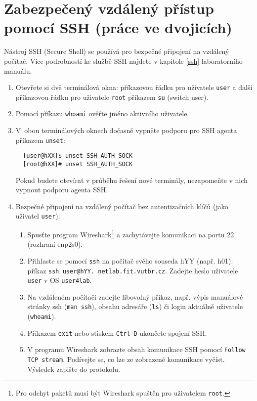 \documentclass[a4paper,11pt]{article}
\begin{document}
\section{Zabezpečený vzdálený přístup pomocí SSH (práce ve dvojicích)}
Nástroj SSH (Secure Shell) se používá pro bezpečné připojení na vzdálený počítač. Více podrobností ke službě SSH najdete v kapitole \ref{ssh} laboratorního manuálu.
\begin{enumerate}
  \item Otevřete si dvě terminálová okna: příkazovou řádku pro uživatele {\tt user} a další
    příkazovou řádku pro uživatele {\tt root} příkazem {\tt su} (switch user).
  \item Pomocí příkazu {\tt whoami} ověřte jméno aktivního uživatele. 
  \item V~obou terminálových oknech dočasně vypněte podporu pro SSH agenta příkazem {\tt unset}:
  \begin{lstlisting}
  [user@hXX]$ unset SSH_AUTH_SOCK
  [root@hXX]# unset SSH_AUTH_SOCK
  \end{lstlisting}

  Pokud budete otevírat v průběhu řešení nové terminály, nezapomeňte v nich vypnout podporu agenta SSH.

  \item Bezpečné připojení na vzdálený počítač bez autentizačních klíčů (jako uživatel {\tt user}):
    \begin{enumerate}
      \item Spusťte program Wireshark\footnote{Pro odchyt paketů musí být Wireshark spuštěn pro uživatelem {\tt root}.} a zachytávejte komunikaci na portu 22 (rozhraní enp2s0).
      \item Přihlaste se pomocí {\tt ssh} na počítač svého souseda hYY (např. h01): příkaz
        {\tt ssh user@hYY. netlab.fit.vutbr.cz}. Zadejte heslo uživatele {\tt user} v OS {\tt user4lab}.
      \item Na vzdáleném počítači zadejte libovolný příkaz, např. výpis manuálové stránky ssh ({\tt man ssh}), obsahu adresáře ({\tt ls}) či login aktuálně uživatele ({\tt whoami}).
      \item Příkazem {\tt exit} nebo stiskem {\tt Ctrl-D} ukončete spojení SSH.
      \item V programu Wireshark zobrazte obsah komunikace SSH pomocí {\tt Follow TCP stream}. Podí\-vej\-te se, co lze ze zobrazené komunikace vyčíst. Výsledek zapište do protokolu.
    \end{enumerate}


\end{enumerate}
\end{document}
